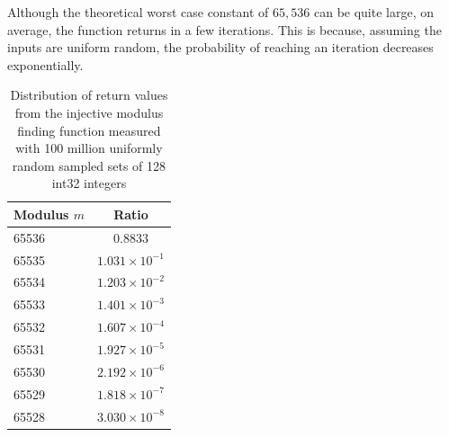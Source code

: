\documentclass{article}
\theoremstyle{plain}
\theoremstyle{definition}
\theoremstyle{remark}
\begin{document}
Although the theoretical worst case constant of $65,536$ can be quite large, on average, the function returns in a few iterations.
This is because, assuming the inputs are uniform random, the probability of reaching an iteration decreases exponentially.

\begin{table}[h]
\caption{Distribution of return values from the injective modulus finding function measured with 100 million uniformly random sampled sets of 128 int32 integers}
\label{tab:modulus_dist}
\vskip 0.15in
\begin{center}
\begin{tabular}{lc}
\toprule
Modulus $m$ & Ratio \\
\midrule
65536 & $0.8833$ \\
65535 & $1.031 \times 10^{-1}$ \\
65534 & $1.203 \times 10^{-2}$ \\
65533 & $1.401 \times 10^{-3}$ \\
65532 & $1.607 \times 10^{-4}$ \\
65531 & $1.927 \times 10^{-5}$ \\
65530 & $2.192 \times 10^{-6}$ \\
65529 & $1.818 \times 10^{-7}$ \\
65528 & $3.030 \times 10^{-8}$ \\
\bottomrule
\end{tabular}
\end{center}
\vskip -0.1in
\end{table}
\end{document}
